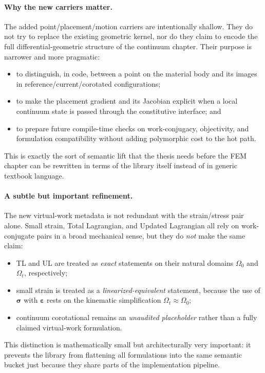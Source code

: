 \paragraph{Why the new carriers matter.}
The added point/placement/motion carriers are intentionally shallow. They do
not try to replace the existing geometric kernel, nor do they claim to encode
the full differential-geometric structure of the continuum chapter. Their
purpose is narrower and more pragmatic:
\begin{itemize}
  \item to distinguish, in code, between a point on the material body and its
  images in reference/current/corotated configurations;
  \item to make the placement gradient and its Jacobian explicit when a local
  continuum state is passed through the constitutive interface; and
  \item to prepare future compile-time checks on work-conjugacy, objectivity,
  and formulation compatibility without adding polymorphic cost to the hot
  path.
\end{itemize}
This is exactly the sort of semantic lift that the thesis needs before the FEM
chapter can be rewritten in terms of the library itself instead of in generic
textbook language.

\paragraph{A subtle but important refinement.}
The new virtual-work metadata is not redundant with the strain/stress pair
alone.  Small strain, Total Lagrangian, and Updated Lagrangian all rely on
work-conjugate pairs in a broad mechanical sense, but they do \emph{not} make
the same claim:
\begin{itemize}
  \item TL and UL are treated as \emph{exact} statements on their natural
  domains \(\Omega_0\) and \(\Omega_t\), respectively;
  \item small strain is treated as a \emph{linearized-equivalent} statement,
  because the use of \(\boldsymbol{\sigma}\) with
  \(\boldsymbol{\varepsilon}\) rests on the kinematic simplification
  \(\Omega_t \approx \Omega_0\);
  \item continuum corotational remains an \emph{unaudited placeholder} rather
  than a fully claimed virtual-work formulation.
\end{itemize}
This distinction is mathematically small but architecturally very important:
it prevents the library from flattening all formulations into the same
semantic bucket just because they share parts of the implementation pipeline.

